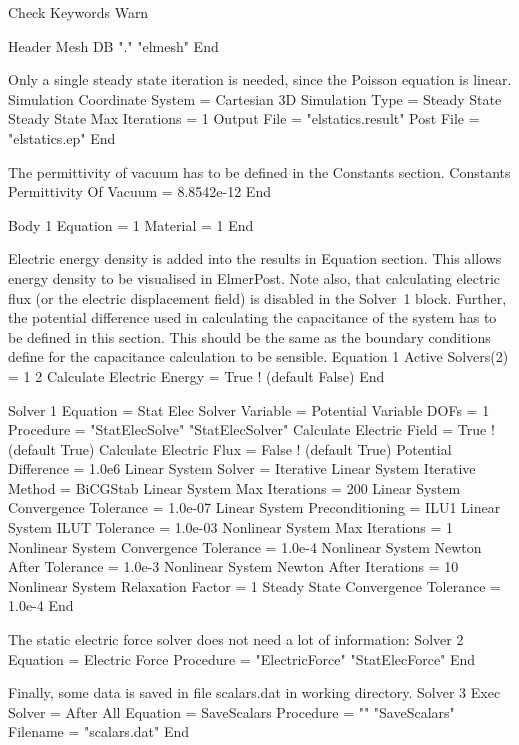 \ttbegin
Check Keywords Warn

Header
  Mesh DB "." "elmesh"
End
\ttend

Only a single steady state iteration is needed, since the Poisson
equation is linear.
\ttbegin
Simulation
  Coordinate System = Cartesian 3D
  Simulation Type = Steady State
  Steady State Max Iterations = 1
  Output File = "elstatics.result"
  Post File = "elstatics.ep"
End
\ttend

The permittivity of vacuum has to be defined in the Constants section.
\ttbegin
Constants
  Permittivity Of Vacuum = 8.8542e-12
End

Body 1
  Equation = 1
  Material = 1
End
\ttend

Electric energy density is added into the results in Equation
section. This allows energy density to be visualised in
ElmerPost. Note also, that calculating electric flux (or the electric
displacement field) is disabled in the Solver~1 block. Further, the
potential difference used in calculating the capacitance of the system
has to be defined in this section. This should be the same as the
boundary conditions define for the capacitance calculation to be
sensible.
\ttbegin
Equation 1
  Active Solvers(2) = 1 2
  Calculate Electric Energy = True  ! (default False)
End

Solver 1
  Equation = Stat Elec Solver
  Variable = Potential
  Variable DOFs = 1
  Procedure = "StatElecSolve" "StatElecSolver"
  Calculate Electric Field = True  ! (default True)
  Calculate Electric Flux = False  ! (default True)
  Potential Difference = 1.0e6
  Linear System Solver = Iterative
  Linear System Iterative Method = BiCGStab
  Linear System Max Iterations = 200
  Linear System Convergence Tolerance = 1.0e-07
  Linear System Preconditioning = ILU1
  Linear System ILUT Tolerance = 1.0e-03
  Nonlinear System Max Iterations = 1
  Nonlinear System Convergence Tolerance = 1.0e-4
  Nonlinear System Newton After Tolerance = 1.0e-3
  Nonlinear System Newton After Iterations = 10
  Nonlinear System Relaxation Factor = 1
  Steady State Convergence Tolerance = 1.0e-4
End
\ttend

The static electric force solver does not need a lot of
information:
\ttbegin
Solver 2
  Equation = Electric Force
  Procedure = "ElectricForce" "StatElecForce"
End
\ttend

Finally, some data is saved in file scalars.dat in working directory.
\ttbegin
Solver 3
  Exec Solver = After All
  Equation = SaveScalars
  Procedure = "" "SaveScalars"
  Filename = "scalars.dat"
End
\ttend

